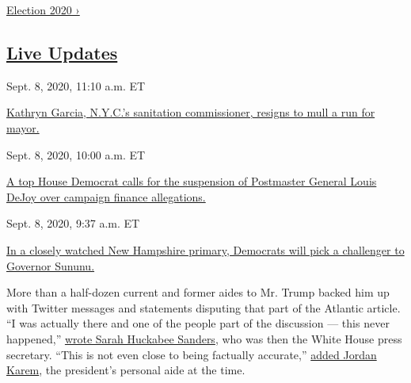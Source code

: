 \href{https://www.nytimes3xbfgragh.onion/news-event/2020-election}{Election
2020 ›}

\hypertarget{live-updates}{%
\subsection{\texorpdfstring{\href{https://www.nytimes3xbfgragh.onion/live/2020/09/08/us/trump-vs-biden}{Live
Updates}}{Live Updates}}\label{live-updates}}

\href{https://www.nytimes3xbfgragh.onion/live/2020/09/08/us/trump-vs-biden\#kathryn-garcia-nycs-sanitation-commissioner-resigns-to-mull-a-run-for-mayor}{}

Sept. 8, 2020, 11:10 a.m. ET

\href{https://www.nytimes3xbfgragh.onion/live/2020/09/08/us/trump-vs-biden\#kathryn-garcia-nycs-sanitation-commissioner-resigns-to-mull-a-run-for-mayor}{Kathryn
Garcia, N.Y.C.'s sanitation commissioner, resigns to mull a run for
mayor.}\href{https://www.nytimes3xbfgragh.onion/live/2020/09/08/us/trump-vs-biden\#a-top-house-democrat-calls-for-the-suspension-of-postmaster-general-louis-dejoy-over-campaign-finance-allegations}{}

Sept. 8, 2020, 10:00 a.m. ET

\href{https://www.nytimes3xbfgragh.onion/live/2020/09/08/us/trump-vs-biden\#a-top-house-democrat-calls-for-the-suspension-of-postmaster-general-louis-dejoy-over-campaign-finance-allegations}{A
top House Democrat calls for the suspension of Postmaster General Louis
DeJoy over campaign finance
allegations.}\href{https://www.nytimes3xbfgragh.onion/live/2020/09/08/us/trump-vs-biden\#in-a-closely-watched-new-hampshire-primary-democrats-will-pick-a-challenger-to-governor-sununu}{}

Sept. 8, 2020, 9:37 a.m. ET

\href{https://www.nytimes3xbfgragh.onion/live/2020/09/08/us/trump-vs-biden\#in-a-closely-watched-new-hampshire-primary-democrats-will-pick-a-challenger-to-governor-sununu}{In
a closely watched New Hampshire primary, Democrats will pick a
challenger to Governor Sununu.}

More than a half-dozen current and former aides to Mr. Trump backed him
up with Twitter messages and statements disputing that part of the
Atlantic article. ``I was actually there and one of the people part of
the discussion --- this never happened,''
\href{https://twitter.com/SarahHuckabee/status/1301702348071460864}{wrote
Sarah Huckabee Sanders}, who was then the White House press secretary.
``This is not even close to being factually accurate,''
\href{https://twitter.com/JordanKarem1/status/1301656144713265158}{added
Jordan Karem}, the president's personal aide at the time.


